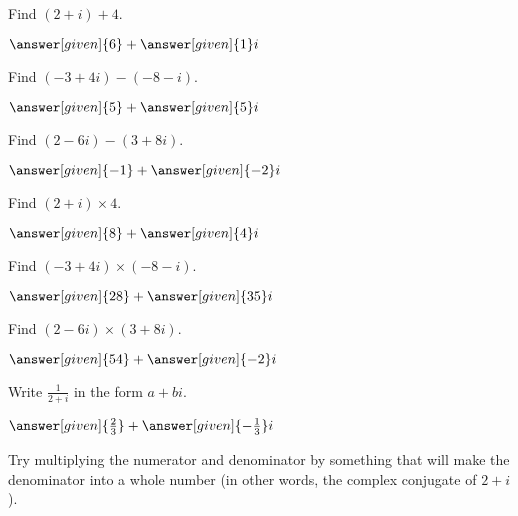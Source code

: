 \documentclass[nooutcomes]{ximera}
\begin{document}
\begin{problem}
Find $(2+i) + 4$.
\begin{prompt}
	$\answer[given]{6} + \answer[given]{1}i$
\end{prompt}
\end{problem}


\begin{problem}
Find $(-3+4i) - (-8 - i)$.
\begin{prompt}
	$\answer[given]{5} + \answer[given]{5}i$
\end{prompt}
\end{problem}


\begin{problem}
Find $(2-6i) - (3+8i)$.
\begin{prompt}
	$\answer[given]{-1} + \answer[given]{-2}i$
\end{prompt}
\end{problem}




\begin{problem}
Find $(2+i) \times 4$.
\begin{prompt}
	$\answer[given]{8} + \answer[given]{4}i$
\end{prompt}
\end{problem}



\begin{problem}
Find $(-3 + 4i) \times (-8 - i)$.
\begin{prompt}
	$\answer[given]{28} + \answer[given]{35}i$
\end{prompt}
\end{problem}




\begin{problem}
Find $(2-6i) \times (3+8i)$.
\begin{prompt}
	$\answer[given]{54} + \answer[given]{-2}i$
\end{prompt}
\end{problem}




\begin{problem}
Write $\frac{1}{2+i}$ in the form $a + bi$.
\begin{prompt}
	$\answer[given]{\frac{2}{3}} + \answer[given]{-\frac{1}{3}}i$
\end{prompt}
\begin{hint}
Try multiplying the numerator and denominator by something that will make the denominator into a whole number (in other words, the complex conjugate of $2+i$).
\end{hint}

\end{problem}
\end{document}
